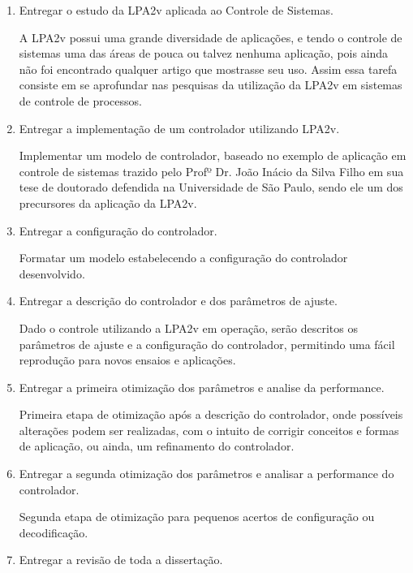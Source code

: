 \begin{enumerate}
  \item \label{LPA2v}	    Entregar o estudo da LPA2v aplicada ao Controle de Sistemas.

A LPA2v possui uma grande diversidade de aplicações, 
e tendo o controle de sistemas 
uma das áreas de pouca ou talvez nenhuma aplicação, 
pois ainda não foi encontrado qualquer artigo que mostrasse seu uso. 
Assim essa tarefa consiste em se aprofundar nas pesquisas 
da utilização da LPA2v em sistemas de controle de processos. 

  \item \label{controlar}   Entregar a implementação de um controlador utilizando LPA2v.

Implementar um modelo de controlador, 
baseado no exemplo de aplicação em controle de sistemas
trazido pelo Profº Dr. João Inácio da Silva Filho em sua 
tese de doutorado defendida na Universidade de São Paulo, 
sendo ele um dos precursores da aplicação da LPA2v. 

  \item \label{configurar}  Entregar a configuração do controlador.

Formatar um modelo estabelecendo a configuração do controlador desenvolvido.

  \item \label{descrever}   Entregar a descrição do controlador e dos parâmetros de ajuste.

Dado o controle utilizando a LPA2v em operação, 
serão descritos os parâmetros de ajuste e a configuração do controlador, 
permitindo uma fácil reprodução para novos ensaios e aplicações.

  \item \label{otimizar1}   Entregar a primeira otimização dos parâmetros e analise da performance.

Primeira etapa de otimização após a descrição do controlador,
onde possíveis alterações podem ser realizadas, 
com o intuito de corrigir conceitos e 
formas de aplicação, ou ainda, 
um refinamento do controlador.

  \item \label{otimizar2}   Entregar a segunda otimização dos parâmetros e analisar a performance do controlador.

Segunda etapa de otimização para pequenos acertos de 
configuração ou decodificação.

  \item \label{entregar}    Entregar a revisão de toda a dissertação.


\end{enumerate}
